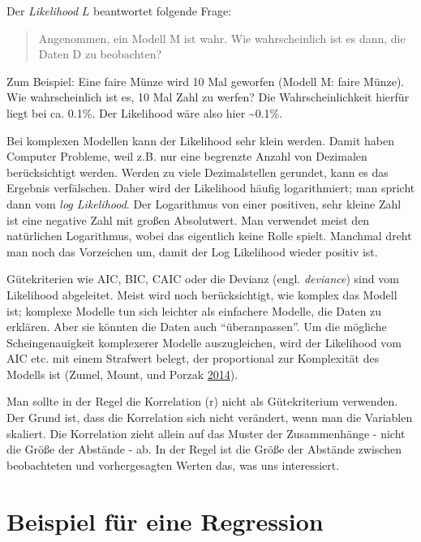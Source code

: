 \documentclass[12pt,ngerman,]{book}
\let\BeginKnitrBlock\begin \let\EndKnitrBlock\end
\begin{document}
Der \emph{Likelihood} \(L\) beantwortet folgende Frage:

\begin{quote}
Angenommen, ein Modell M ist wahr. Wie wahrscheinlich ist es dann, die
Daten D zu beobachten?
\end{quote}

Zum Beispiel: Eine faire Münze wird 10 Mal geworfen (Modell M: faire
Münze). Wie wahrscheinlich ist es, 10 Mal Zahl zu werfen? Die
Wahrscheinlichkeit hierfür liegt bei ca. 0.1\%. Der Likelihood wäre also
hier \textasciitilde{}0.1\%.

Bei komplexen Modellen kann der Likelihood sehr klein werden. Damit
haben Computer Probleme, weil z.B. nur eine begrenzte Anzahl von
Dezimalen berücksichtigt werden. Werden zu viele Dezimalstellen
gerundet, kann es das Ergebnis verfälschen. Daher wird der Likelihood
häufig logarithmiert; man spricht dann vom \emph{log Likelihood}. Der
Logarithmus von einer positiven, sehr kleine Zahl ist eine negative Zahl
mit großen Absolutwert. Man verwendet meist den natürlichen Logarithmus,
wobei das eigentlich keine Rolle spielt. Manchmal dreht man noch das
Vorzeichen um, damit der Log Likelihood wieder positiv ist.

Gütekriterien wie AIC, BIC, CAIC oder die Devianz (engl.
\emph{deviance}) sind vom Likelihood abgeleitet. Meist wird noch
berücksichtigt, wie komplex das Modell ist; komplexe Modelle tun sich
leichter als einfachere Modelle, die Daten zu erklären. Aber sie könnten
die Daten auch ``überanpassen''. Um die mögliche Scheingenauigkeit
komplexerer Modelle auszugleichen, wird der Likelihood vom AIC etc. mit
einem Strafwert belegt, der proportional zur Komplexität des Modells ist
(Zumel, Mount, und Porzak
\protect\hyperlink{ref-zumel2014practical}{2014}).

\BeginKnitrBlock{rmdcaution}
Man sollte in der Regel die Korrelation (r) nicht als Gütekriterium
verwenden. Der Grund ist, dass die Korrelation sich nicht verändert,
wenn man die Variablen skaliert. Die Korrelation zieht allein auf das
Muster der Zusammenhänge - nicht die Größe der Abstände - ab. In der
Regel ist die Größe der Abstände zwischen beobachteten und
vorhergesagten Werten das, was uns interessiert.
\EndKnitrBlock{rmdcaution}

\section{Beispiel für eine
Regression}\label{beispiel-fur-eine-regression}
\end{document}
